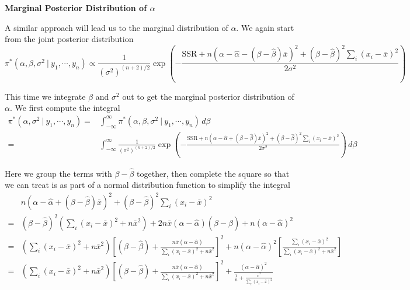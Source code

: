 \documentclass[]{book}
\theoremstyle{definition}
\theoremstyle{definition}
\theoremstyle{definition}
\theoremstyle{remark}
\begin{document}
\textbf{Marginal Posterior Distribution of \(\alpha\)}

A similar approach will lead us to the marginal distribution of
\(\alpha\). We again start from the joint posterior distribution
\[ \pi^*(\alpha, \beta, \sigma^2~|~y_1,\cdots,y_n) \propto \frac{1}{(\sigma^2)^{(n+2)/2}}\exp\left(-\frac{\text{SSR} + n(\alpha-\hat{\alpha}-(\beta-\hat{\beta})\bar{x})^2 + (\beta - \hat{\beta})^2\sum_i (x_i-\bar{x})^2}{2\sigma^2}\right) \]

This time we integrate \(\beta\) and \(\sigma^2\) out to get the
marginal posterior distribution of \(\alpha\). We first compute the
integral \[
\begin{aligned}
\pi^*(\alpha, \sigma^2~|~y_1,\cdots, y_n) = & \int_{-\infty}^\infty \pi^*(\alpha, \beta, \sigma^2~|~y_1,\cdots, y_n)\, d\beta\\
= & \int_{-\infty}^\infty \frac{1}{(\sigma^2)^{(n+2)/2}}\exp\left(-\frac{\text{SSR} + n(\alpha-\hat{\alpha}+(\beta-\hat{\beta})\bar{x})^2 + (\beta - \hat{\beta})^2\sum_i (x_i-\bar{x})^2}{2\sigma^2}\right)\, d\beta 
\end{aligned}
\]

Here we group the terms with \(\beta-\hat{\beta}\) together, then
complete the square so that we can treat is as part of a normal
distribution function to simplify the integral \[
\begin{aligned}
& n(\alpha-\hat{\alpha}+(\beta-\hat{\beta})\bar{x})^2+(\beta-\hat{\beta})^2\sum_i(x_i-\bar{x})^2 \\
= & (\beta-\hat{\beta})^2\left(\sum_i (x_i-\bar{x})^2 + n\bar{x}^2\right) + 2n\bar{x}(\alpha-\hat{\alpha})(\beta-\hat{\beta}) + n(\alpha-\hat{\alpha})^2 \\
= & \left(\sum_i (x_i-\bar{x})^2 + n\bar{x}^2\right)\left[(\beta-\hat{\beta})+\frac{n\bar{x}(\alpha-\hat{\alpha})}{\sum_i(x_i-\bar{x})^2+n\bar{x}^2}\right]^2+ n(\alpha-\hat{\alpha})^2\left[\frac{\sum_i(x_i-\bar{x})^2}{\sum_i (x_i-\bar{x})^2+n\bar{x}^2}\right]\\
= & \left(\sum_i (x_i-\bar{x})^2 + n\bar{x}^2\right)\left[(\beta-\hat{\beta})+\frac{n\bar{x}(\alpha-\hat{\alpha})}{\sum_i(x_i-\bar{x})^2+n\bar{x}^2}\right]^2+\frac{(\alpha-\hat{\alpha})^2}{\frac{1}{n}+\frac{\bar{x}^2}{\sum_i (x_i-\bar{x})^2}}
\end{aligned}
\]
\end{document}
